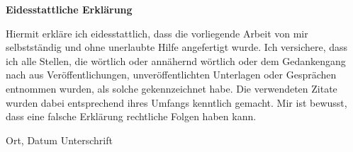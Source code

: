 \thispagestyle{empty}

\begin{titlepage}
  \vspace*{5cm}

  \begin{center}
    {\LARGE\bfseries Eidesstattliche Erklärung}\\[2cm]
  \end{center}
    Hiermit erkläre ich eidesstattlich, dass die vorliegende Arbeit von mir selbstständig und ohne unerlaubte Hilfe angefertigt wurde. Ich versichere, dass ich alle Stellen, die wörtlich oder annähernd wörtlich oder dem Gedankengang nach aus Veröffentlichungen, unveröffentlichten Unterlagen oder Gesprächen entnommen wurden, als solche gekennzeichnet habe. Die verwendeten Zitate wurden dabei entsprechend ihres Umfangs kenntlich gemacht. Mir ist bewusst, dass eine falsche Erklärung rechtliche Folgen haben kann.

    \vspace{2cm}

Ort, Datum \hfill Unterschrift
  \vfill
\end{titlepage}